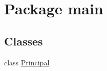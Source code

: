 \hypertarget{namespacemain}{}\section{Package main}
\label{namespacemain}
\subsection*{Classes}
\begin{DoxyCompactItemize}
\item 
class \mbox{\hyperlink{classmain_1_1_principal}{Principal}}
\end{DoxyCompactItemize}
